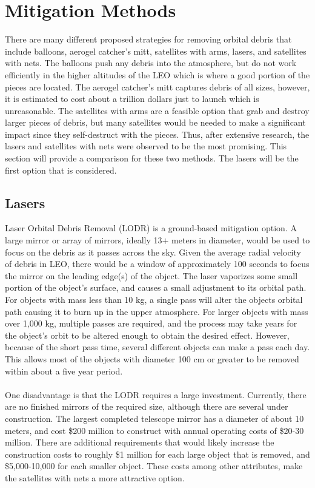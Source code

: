 \documentclass{article}
\theoremstyle{plain}			%
\theoremstyle{definition}		%
\theoremstyle{remark}
\numberwithin{equation}{section}
\numberwithin{figure}{section}
\numberwithin{table}{section}
\begin{document}
\section{Mitigation Methods}
There are many different proposed strategies for removing orbital debris that include balloons, aerogel catcher's mitt, satellites with arms, lasers, and satellites with nets.  The balloons push any debris into the atmosphere, but do not work efficiently in the higher altitudes of the LEO which is where a good portion of the pieces are located.  The aerogel catcher's mitt captures debris of all sizes, however, it is estimated to cost about a trillion dollars just to launch which is unreasonable.  The satellites with arms are a feasible option that grab and destroy larger pieces of debris, but many satellites would be needed to make a significant impact since they self-destruct with the pieces.  Thus, after extensive research, the lasers and satellites with nets were observed to be the most promising. This section will provide a comparison for these two methods.  The lasers will be the first option that is considered.
\subsection{Lasers}
Laser Orbital Debris Removal (LODR) is a ground-based mitigation option. A large mirror or array of mirrors, ideally 13$+$ meters in diameter, would be used to focus on the debris as it passes across the sky. Given the average radial velocity of debris in LEO, there would be a window of approximately 100 seconds to focus the mirror on the leading edge(s) of the object. The laser vaporizes some small portion of the object's surface, and causes a small adjustment to its orbital path. For objects with mass less than 10 kg, a single pass will alter the objects orbital path causing it to burn up in the upper atmosphere. For larger objects with mass over 1,000 kg, multiple passes are required, and the process may take years for the object's orbit to be altered enough to obtain the desired effect. However, because of the short pass time, several different objects can make a pass each day. This allows most of the objects with diameter 100 cm or greater to be removed within about a five year period.\\
\\
One disadvantage is that the LODR requires a large investment. Currently, there are no finished mirrors of the required size, although there are several under construction. The largest completed telescope mirror has a diameter of about 10 meters, and cost \$200 million to construct with annual operating costs of \$20-30 million. There are additional requirements that would likely increase the construction costs to roughly \$1 million for each large object that is removed, and \$5,000-10,000 for each smaller object. These costs among other attributes, make the satellites with nets a more attractive option.
\end{document}

